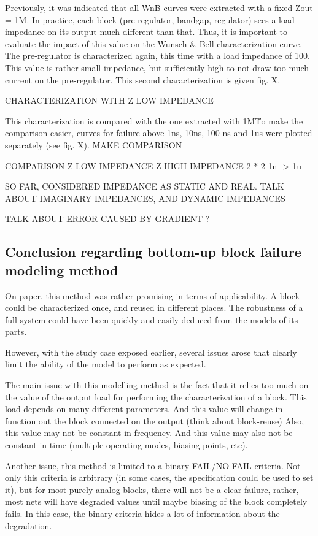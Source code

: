 Previously, it was indicated that all WnB curves were extracted with a fixed Zout = 1M\textOmega.
In practice, each block (pre-regulator, bandgap, regulator) sees a load impedance on its output much different than that.
Thus, it is important to evaluate the impact of this value on the Wunsch & Bell characterization curve.
The pre-regulator is characterized again, this time with a load impedance of 100\textOmega.
This value is rather small impedance, but sufficiently high to not draw too much current on the pre-regulator.
This second characterization is given fig. X.

CHARACTERIZATION WITH Z LOW IMPEDANCE

This characterization is compared with the one extracted with 1M\textOmega\.
To make the comparison easier, curves for failure above 1ns, 10ns, 100 ns and 1us were plotted separately (see fig. X).
MAKE COMPARISON

COMPARISON Z LOW IMPEDANCE Z HIGH IMPEDANCE 2 * 2 1n -> 1u

SO FAR, CONSIDERED IMPEDANCE AS STATIC AND REAL.
TALK ABOUT IMAGINARY IMPEDANCES, AND DYNAMIC IMPEDANCES

TALK ABOUT ERROR CAUSED BY GRADIENT ?

\subsection{Conclusion regarding bottom-up block failure modeling method}

On paper, this method was rather promising in terms of applicability.
A block could be characterized once, and reused in different places.
The robustness of a full system could have been quickly and easily deduced from the models of its parts.

However, with the study case exposed earlier, several issues arose that clearly limit the ability of the model to perform as expected.

The main issue with this modelling method is the fact that it relies too much
on the value of the output load for performing the characterization of a block.
This load depends on many different parameters.
And this value will change in function out the block connected on the output (think about block-reuse)
Also, this value may not be constant in frequency.
And this value may also not be constant in time (multiple operating modes, biasing points, etc).

Another issue, this method is limited to a binary FAIL/NO FAIL criteria.
Not only this criteria is arbitrary (in some cases, the specification could be used to set it), but
for most purely-analog blocks, there will not be a clear failure, rather, most
nets will have degraded values until maybe biasing of the block completely fails.
In this case, the binary criteria hides a lot of information about the degradation.

